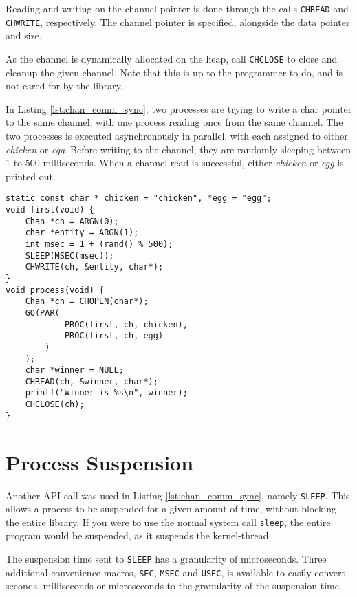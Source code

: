Reading and writing on the channel pointer is done through the calls \texttt{CHREAD} and \texttt{CHWRITE}, respectively. The channel pointer is specified, alongside the data pointer and size.

As the channel is dynamically allocated on the heap, call \texttt{CHCLOSE} to close and cleanup the given channel. Note that this is up to the programmer to do, and is not cared for by the library.

In Listing \ref{lst:chan_comm_sync}, two processes are trying to write a char pointer to the same channel, with one process reading once from the same channel. The two processes is executed asynchronously in parallel, with each assigned to either \textit{chicken} or \textit{egg}. Before writing to the channel, they are randomly sleeping between 1 to 500 milliseconds. When a channel read is successful, either \textit{chicken} or \textit{egg} is printed out. 

\noindent\begin{minipage}{\textwidth}
\begin{lstlisting}[style={CustomC},caption={Channel communication and synchronization},label={lst:chan_comm_sync}]
static const char * chicken = "chicken", *egg = "egg";
void first(void) {
    Chan *ch = ARGN(0);
    char *entity = ARGN(1);
    int msec = 1 + (rand() % 500); 
    SLEEP(MSEC(msec));
    CHWRITE(ch, &entity, char*);
}
void process(void) {
    Chan *ch = CHOPEN(char*);
    GO(PAR(
            PROC(first, ch, chicken),
            PROC(first, ch, egg)
        )
    );
    char *winner = NULL;
    CHREAD(ch, &winner, char*);
    printf("Winner is %s\n", winner);
    CHCLOSE(ch);
}
\end{lstlisting}
\end{minipage}

\section*{Process Suspension}

Another API call was used in Listing \ref{lst:chan_comm_sync}, namely \texttt{SLEEP}. This allows a process to be suspended for a given amount of time, without blocking the entire library. If you were to use the normal system call \texttt{sleep}, the entire program would be suspended, as it suspends the kernel\hyp{}thread. 

The suspension time sent to \texttt{SLEEP} has a granularity of microseconds. Three additional convenience macros, \texttt{SEC}, \texttt{MSEC} and \texttt{USEC}, is available to easily convert seconds, milliseconds or microseconds to the granularity of the suspension time. 


